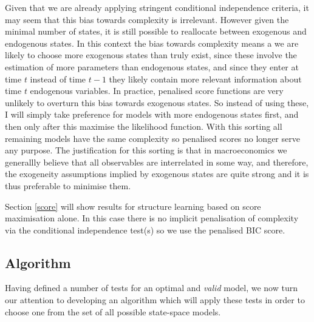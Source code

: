 \documentclass{article}
\begin{document}
Given that we are already applying stringent conditional independence criteria, it may seem that this bias towards complexity is irrelevant. However given the minimal number of states, it is still possible to reallocate between exogenous and endogenous states. In this context the bias towards complexity means a we are likely to choose more exogenous states than truly exist, since these involve the estimation of more parameters than endogenous states, and since they enter at time $t$ instead of time $t-1$ they likely contain more relevant information about time $t$ endogenous variables. In practice, penalised score functions are very unlikely to overturn this bias towards exogenous states. So instead of using these, I will simply take preference for models with more endogenous states first, and then only after this maximise the likelihood function. With this sorting all remaining models have the same complexity so penalised scores no longer serve any purpose. The justification for this sorting is that in macroeconomics we generallly believe that all observables are interrelated in some way, and therefore, the exogeneity assumptions implied by exogenous states are quite strong and it is thus preferable to minimise them. 

Section \ref{score} will show results for structure learning based on score maximisation alone. In this case there is no implicit penalisation of complexity via the conditional independence test(s) so we use the penalised BIC score. 

\subsection{Algorithm} \label{algo}

Having defined a number of tests for an optimal and \textit{valid} model, we now turn our attention to developing an algorithm which will apply these tests in order to choose one from the set of all possible state-space models.
\end{document}
